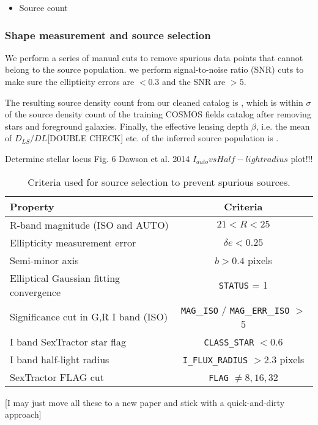 \documentclass[letterpaper,useAMS,usenatbib]{mn2e}
\def\code#1{\texttt{#1}}
\begin{document}
\begin{itemize}
\item Source count
\end{itemize}


\subsubsection{Shape measurement and source selection}
We perform a series of manual cuts to remove spurious data points that cannot 
belong to the source population.
we perform signal-to-noise ratio (SNR) cuts to make sure the ellipticity errors are $< 0.3$ 
and the SNR are $>5$.

The resulting source density count from our cleaned catalog is , which is
within $\sigma$ of the source density count of the training COSMOS fields
catalog after removing stars and foreground galaxies.  
Finally, the effective lensing depth $\beta$, i.e. the mean of $D_{LS} / D{L}$[DOUBLE
CHECK] etc. of the inferred source population is .  


Determine stellar locus
Fig. 6 Dawson et al. 2014 $I_{auto} vs Half-light radius$ plot!!!

\begin{table}
	\caption{Criteria used for source selection to prevent spurious sources.} 
\begin{center} 
\begin{tabular}{@{}lc}
\toprule Property & Criteria \\ \toprule
R-band magnitude (ISO and AUTO)  & $21 <  R < 25$ \\
Ellipticity measurement error & $\delta e < 0.25$ \\
Semi-minor axis & $b > 0.4$ pixels \\
Elliptical Gaussian fitting convergence & \code{STATUS} = 1\\
Significance cut in G,R I band (ISO) & \code{MAG}\_{\code{ISO}} /
\code{MAG}\_\code{ERR}\_{\code{ISO}} $>$ 5 \\ 
I band SexTractor star flag& \code{CLASS\_STAR} $ < 0.6$ \\
I band half-light radius & \code{I\_FLUX\_RADIUS} $ > 2.3$ pixels\\
SexTractor FLAG cut & \code{FLAG} $\neq 8, 16, 32$\\
\bottomrule
\end{tabular} 
\end{center} 
\label{tab:cuts} 
\end{table} 
[I may just move all these to a new paper and stick with a quick-and-dirty
approach]
\end{document}
